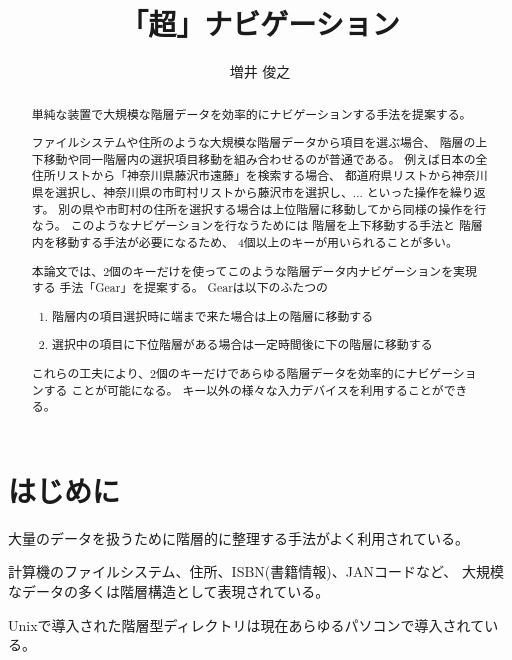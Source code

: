 \documentclass[twoside]{wiss}
\begin{document}
\title{「超」ナビゲーション}
\etitle{} %

\author{増井 俊之}

\begin{abstract}
単純な装置で大規模な階層データを効率的にナビゲーションする手法を提案する。

ファイルシステムや住所のような大規模な階層データから項目を選ぶ場合、
階層の上下移動や同一階層内の選択項目移動を組み合わせるのが普通である。
例えば日本の全住所リストから「神奈川県藤沢市遠藤」を検索する場合、
都道府県リストから神奈川県を選択し、神奈川県の市町村リストから藤沢市を選択し、...
といった操作を繰り返す。
別の県や市町村の住所を選択する場合は上位階層に移動してから同様の操作を行なう。
このようなナビゲーションを行なうためには
階層を上下移動する手法と
階層内を移動する手法が必要になるため、
4個以上のキーが用いられることが多い。

本論文では、2個のキーだけを使ってこのような階層データ内ナビゲーションを実現する
手法「Gear」を提案する。
Gearは以下のふたつの

\begin{enumerate}
\item 階層内の項目選択時に端まで来た場合は上の階層に移動する
\item 選択中の項目に下位階層がある場合は一定時間後に下の階層に移動する
\end{enumerate}

これらの工夫により、2個のキーだけであらゆる階層データを効率的にナビゲーションする
ことが可能になる。
キー以外の様々な入力デバイスを利用することができる。
\end{abstract}

\maketitle

\section{はじめに}

大量のデータを扱うために階層的に整理する手法がよく利用されている。

計算機のファイルシステム、住所、ISBN(書籍情報)、JANコードなど、
大規模なデータの多くは階層構造として表現されている。

Unixで導入された階層型ディレクトリは現在あらゆるパソコンで導入されている。
\end{document}
